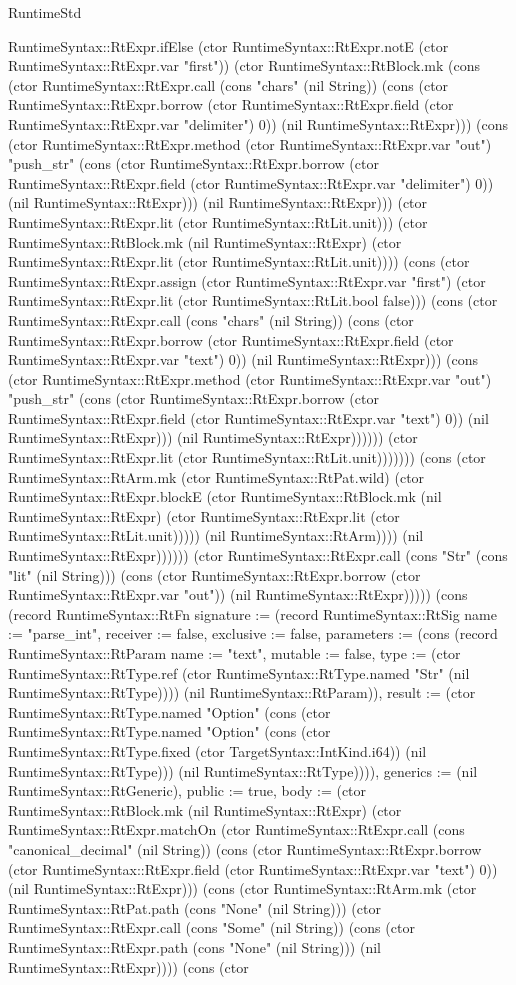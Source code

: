 \begin{lexlean}{RuntimeStd}
\begin{semanticmodule}
{RuntimeSyntax::RtExpr.ifElse (ctor RuntimeSyntax::RtExpr.notE (ctor RuntimeSyntax::RtExpr.var "first")) (ctor RuntimeSyntax::RtBlock.mk (cons (ctor RuntimeSyntax::RtExpr.call (cons "chars" (nil String)) (cons (ctor RuntimeSyntax::RtExpr.borrow (ctor RuntimeSyntax::RtExpr.field (ctor RuntimeSyntax::RtExpr.var "delimiter") 0)) (nil RuntimeSyntax::RtExpr))) (cons (ctor RuntimeSyntax::RtExpr.method (ctor RuntimeSyntax::RtExpr.var "out") "push_str" (cons (ctor RuntimeSyntax::RtExpr.borrow (ctor RuntimeSyntax::RtExpr.field (ctor RuntimeSyntax::RtExpr.var "delimiter") 0)) (nil RuntimeSyntax::RtExpr))) (nil RuntimeSyntax::RtExpr))) (ctor RuntimeSyntax::RtExpr.lit (ctor RuntimeSyntax::RtLit.unit))) (ctor RuntimeSyntax::RtBlock.mk (nil RuntimeSyntax::RtExpr) (ctor RuntimeSyntax::RtExpr.lit (ctor RuntimeSyntax::RtLit.unit)))) (cons (ctor RuntimeSyntax::RtExpr.assign (ctor RuntimeSyntax::RtExpr.var "first") (ctor RuntimeSyntax::RtExpr.lit (ctor RuntimeSyntax::RtLit.bool false))) (cons (ctor RuntimeSyntax::RtExpr.call (cons "chars" (nil String)) (cons (ctor RuntimeSyntax::RtExpr.borrow (ctor RuntimeSyntax::RtExpr.field (ctor RuntimeSyntax::RtExpr.var "text") 0)) (nil RuntimeSyntax::RtExpr))) (cons (ctor RuntimeSyntax::RtExpr.method (ctor RuntimeSyntax::RtExpr.var "out") "push_str" (cons (ctor RuntimeSyntax::RtExpr.borrow (ctor RuntimeSyntax::RtExpr.field (ctor RuntimeSyntax::RtExpr.var "text") 0)) (nil RuntimeSyntax::RtExpr))) (nil RuntimeSyntax::RtExpr)))))) (ctor RuntimeSyntax::RtExpr.lit (ctor RuntimeSyntax::RtLit.unit))))))) (cons (ctor RuntimeSyntax::RtArm.mk (ctor RuntimeSyntax::RtPat.wild) (ctor RuntimeSyntax::RtExpr.blockE (ctor RuntimeSyntax::RtBlock.mk (nil RuntimeSyntax::RtExpr) (ctor RuntimeSyntax::RtExpr.lit (ctor RuntimeSyntax::RtLit.unit))))) (nil RuntimeSyntax::RtArm)))) (nil RuntimeSyntax::RtExpr)))))) (ctor RuntimeSyntax::RtExpr.call (cons "Str" (cons "lit" (nil String))) (cons (ctor RuntimeSyntax::RtExpr.borrow (ctor RuntimeSyntax::RtExpr.var "out")) (nil RuntimeSyntax::RtExpr))))}) (cons (record RuntimeSyntax::RtFn {signature := (record RuntimeSyntax::RtSig {name := "parse_int", receiver := false, exclusive := false, parameters := (cons (record RuntimeSyntax::RtParam {name := "text", mutable := false, type := (ctor RuntimeSyntax::RtType.ref (ctor RuntimeSyntax::RtType.named "Str" (nil RuntimeSyntax::RtType)))}) (nil RuntimeSyntax::RtParam)), result := (ctor RuntimeSyntax::RtType.named "Option" (cons (ctor RuntimeSyntax::RtType.named "Option" (cons (ctor RuntimeSyntax::RtType.fixed (ctor TargetSyntax::IntKind.i64)) (nil RuntimeSyntax::RtType))) (nil RuntimeSyntax::RtType)))}), generics := (nil RuntimeSyntax::RtGeneric), public := true, body := (ctor RuntimeSyntax::RtBlock.mk (nil RuntimeSyntax::RtExpr) (ctor RuntimeSyntax::RtExpr.matchOn (ctor RuntimeSyntax::RtExpr.call (cons "canonical_decimal" (nil String)) (cons (ctor RuntimeSyntax::RtExpr.borrow (ctor RuntimeSyntax::RtExpr.field (ctor RuntimeSyntax::RtExpr.var "text") 0)) (nil RuntimeSyntax::RtExpr))) (cons (ctor RuntimeSyntax::RtArm.mk (ctor RuntimeSyntax::RtPat.path (cons "None" (nil String))) (ctor RuntimeSyntax::RtExpr.call (cons "Some" (nil String)) (cons (ctor RuntimeSyntax::RtExpr.path (cons "None" (nil String))) (nil RuntimeSyntax::RtExpr)))) (cons (ctor }
\end{semanticmodule}
\end{lexlean}
